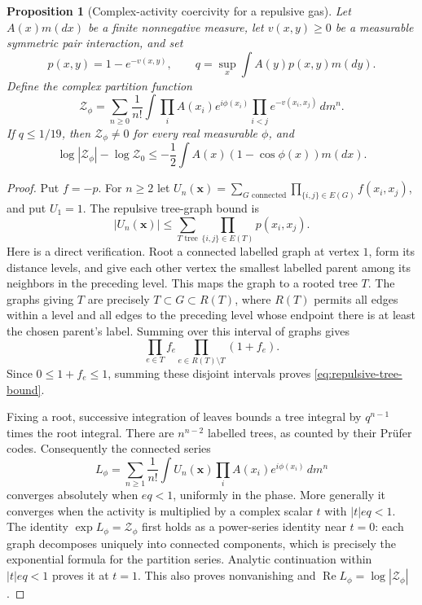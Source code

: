 \documentclass[11pt]{article}
\newtheorem{proposition}[theorem]{Proposition}
\theoremstyle{remark}\newtheorem{remark}[theorem]{Remark}
\begin{document}
\begin{proposition}[Complex-activity coercivity for a repulsive gas]
\label{prop:complex-coercivity}
Let $A(x)m(dx)$ be a finite nonnegative measure, let $v(x,y)\ge0$ be a
measurable symmetric pair interaction, and set
\[
 p(x,y)=1-e^{-v(x,y)},\qquad
 q=\sup_x\int A(y)p(x,y)m(dy).
\]
Define the complex partition function
\[
 \mathcal Z_\phi=
 \sum_{n\ge0}\frac1{n!}\int
       \prod_i A(x_i)e^{i\phi(x_i)}
       \prod_{i<j}e^{-v(x_i,x_j)}\,dm^n.
\]
If $q\le1/19$, then $\mathcal Z_\phi\ne0$ for every real measurable
$\phi$, and
\begin{equation}\label{eq:complex-coercivity}
 \log|\mathcal Z_\phi|-\log\mathcal Z_0
 \le-\frac12\int A(x)(1-\cos\phi(x))m(dx).
\end{equation}
\end{proposition}
\begin{proof}
Put $f=-p$.  For $n\ge2$ let
$U_n(\mathbf x)=\sum_{G\text{ connected}}\prod_{\{i,j\}\in E(G)}f(x_i,x_j)$,
and put $U_1=1$.  The repulsive tree-graph bound is
\begin{equation}\label{eq:repulsive-tree-bound}
 |U_n(\mathbf x)|\le
       \sum_{T\text{ tree}}\prod_{\{i,j\}\in E(T)}p(x_i,x_j).
\end{equation}
Here is a direct verification.  Root a connected labelled graph at vertex
$1$, form its distance levels, and give each other vertex the smallest
labelled parent among its neighbors in the preceding level.  This maps
the graph to a rooted tree $T$.  The graphs giving $T$ are precisely
$T\subset G\subset R(T)$, where $R(T)$ permits all edges within a level
and all edges to the preceding level whose endpoint there is at least
the chosen parent's label.  Summing over this interval of graphs gives
\[
 \prod_{e\in T}f_e\prod_{e\in R(T)\setminus T}(1+f_e).
\]
Since $0\le1+f_e\le1$, summing these disjoint intervals proves
\eqref{eq:repulsive-tree-bound}.

Fixing a root, successive integration of leaves bounds a tree integral
by $q^{n-1}$ times the root integral.  There are $n^{n-2}$ labelled
trees, as counted by their Pr\"ufer codes.  Consequently the connected
series
\begin{equation}\label{eq:connected-complex-series}
 L_\phi=\sum_{n\ge1}\frac1{n!}
       \int U_n(\mathbf x)\prod_i A(x_i)e^{i\phi(x_i)}\,dm^n
\end{equation}
converges absolutely when $eq<1$, uniformly in the phase.  More generally
it converges when the activity is multiplied by a complex scalar $t$
with $|t|eq<1$.  The identity $\exp L_\phi=\mathcal Z_\phi$ first
holds as a power-series identity near $t=0$: each graph decomposes
uniquely into connected components, which is precisely the exponential
formula for the partition series.  Analytic continuation within
$|t|eq<1$ proves it at $t=1$.  This also proves nonvanishing and
$\operatorname{Re}L_\phi=\log|\mathcal Z_\phi|$.


\end{proof}
\end{document}
